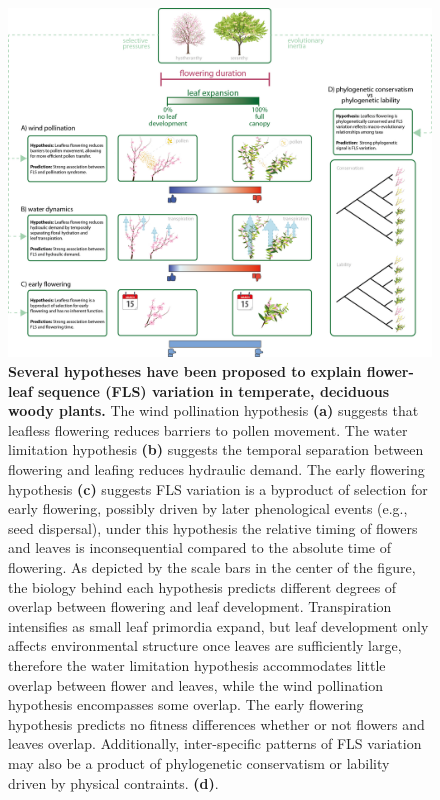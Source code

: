\documentclass[11pt]{article}
\begin{document}
\begin{figure}[h!]
    \centering
 \includegraphics[width=\textwidth]{..//..//HarvardForest/concept_hystheranty_wide_text_overlaps.png}  
    \caption{\textbf{Several hypotheses have been proposed to explain flower-leaf sequence (FLS) variation in temperate, deciduous woody plants.}  The wind pollination hypothesis \textbf{(a)} suggests that leafless flowering reduces barriers to pollen movement. The water limitation hypothesis \textbf{(b)} suggests the temporal separation between flowering and leafing reduces hydraulic demand. The early flowering hypothesis \textbf{(c)} suggests FLS variation is a byproduct of selection for early flowering, possibly driven by later phenological events (e.g., seed dispersal), under this hypothesis the relative timing of flowers and leaves is inconsequential compared to the absolute time of flowering. As depicted by the scale bars in the center of the figure, the biology behind each hypothesis predicts different degrees of overlap between flowering and leaf development. Transpiration intensifies as small leaf primordia expand, but leaf development only affects environmental structure once leaves are sufficiently large, therefore the water limitation hypothesis accommodates little overlap between flower and leaves, while the wind pollination hypothesis encompasses some overlap. The early flowering hypothesis predicts no fitness differences whether or not flowers and leaves overlap. Additionally, inter-specific patterns of FLS variation may also be a product of phylogenetic conservatism or lability driven by physical contraints. \textbf{(d)}.}
    \label{fig:conceptual}
\end{figure}
\end{document}
